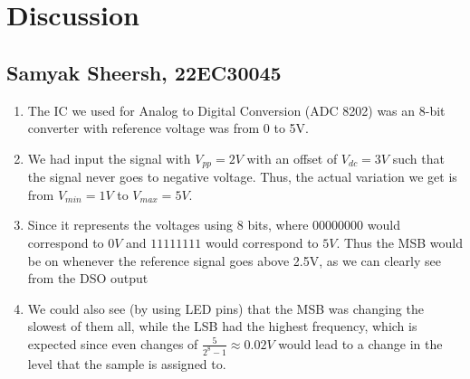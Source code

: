 \documentclass{article}
\begin{document}
\section{Discussion}
\subsection{Samyak Sheersh, 22EC30045}
\begin{enumerate}
  \item The IC we used for Analog to Digital Conversion (ADC 8202) was an 8-bit converter with reference voltage was from 0 to 5V. 
  \item We had input the signal with $V_{pp}=2V$ with an offset of $V_{dc}=3V$ such that the signal never goes to negative voltage. Thus, the actual variation we get is from $V_{min}=1V$ to $V_{max}=5V$.
  \item Since it represents the voltages using 8 bits, where $00000000$ would correspond to $0V$ and $11111111$ would correspond to $5V$. Thus the MSB would be on whenever the reference signal goes above 2.5V, as we can clearly see from the DSO output
  \item We could also see (by using LED pins) that the MSB was changing the slowest of them all, while the LSB had the highest frequency, which is expected since even changes of $\frac{5}{2^{8}-1}\approx 0.02V$ would lead to a change in the level that the sample is assigned to.  
\end{enumerate}
\end{document}
